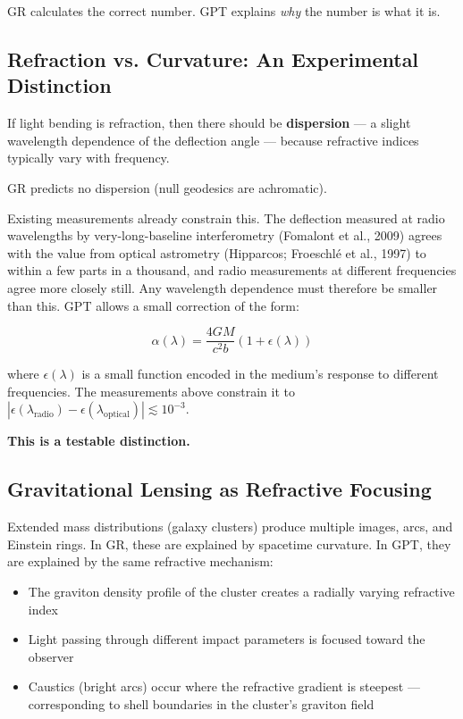 \documentclass[12pt, a4paper]{article}
\begin{document}
GR calculates the correct number. GPT explains \textit{why} the number is what it is.

\subsection{Refraction vs. Curvature: An Experimental Distinction}
\label{subsec:dispersion_prediction}

If light bending is refraction, then there should be \textbf{dispersion} — a slight wavelength dependence of the deflection angle — because refractive indices typically vary with frequency.

GR predicts no dispersion (null geodesics are achromatic).

Existing measurements already constrain this. The deflection measured at radio wavelengths by very-long-baseline interferometry (Fomalont et al., 2009) agrees with the value from optical astrometry (Hipparcos; Froeschl\'e et al., 1997) to within a few parts in a thousand, and radio measurements at different frequencies agree more closely still. Any wavelength dependence must therefore be smaller than this. GPT allows a small correction of the form:

\[
\alpha(\lambda) = \frac{4GM}{c^2 b} \left(1 + \epsilon(\lambda) \right)
\]

where \( \epsilon(\lambda) \) is a small function encoded in the medium's response to different frequencies. The measurements above constrain it to \( |\epsilon(\lambda_{\text{radio}}) - \epsilon(\lambda_{\text{optical}})| \lesssim 10^{-3} \). 

\textbf{This is a testable distinction.}

\subsection{Gravitational Lensing as Refractive Focusing}
\label{subsec:lensing_focusing}

Extended mass distributions (galaxy clusters) produce multiple images, arcs, and Einstein rings. In GR, these are explained by spacetime curvature. In GPT, they are explained by the same refractive mechanism:

\begin{itemize}
    \item The graviton density profile of the cluster creates a radially varying refractive index
    \item Light passing through different impact parameters is focused toward the observer
    \item Caustics (bright arcs) occur where the refractive gradient is steepest — corresponding to shell boundaries in the cluster's graviton field
\end{itemize}
\end{document}
